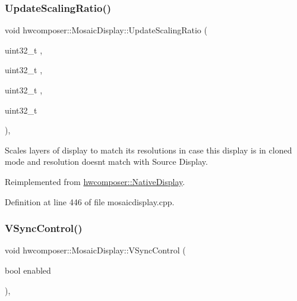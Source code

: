 \subsubsection{\texorpdfstring{Update\+Scaling\+Ratio()}{UpdateScalingRatio()}}
{\footnotesize\ttfamily void hwcomposer\+::\+Mosaic\+Display\+::\+Update\+Scaling\+Ratio (\begin{DoxyParamCaption}\item[{uint32\+\_\+t}]{,  }\item[{uint32\+\_\+t}]{,  }\item[{uint32\+\_\+t}]{,  }\item[{uint32\+\_\+t}]{ }\end{DoxyParamCaption})\hspace{0.3cm}{\ttfamily [override]}, {\ttfamily [virtual]}}

Scales layers of display to match it\textquotesingle{}s resolutions in case this display is in cloned mode and resolution doesn\textquotesingle{}t match with Source Display. 

Reimplemented from \mbox{\hyperlink{classhwcomposer_1_1NativeDisplay_abfad592c2a5e956760c194fa7831171c}{hwcomposer\+::\+Native\+Display}}.



Definition at line 446 of file mosaicdisplay.\+cpp.


\begin{DoxyCode}{0}
\end{DoxyCode}
\mbox{\label{classhwcomposer_1_1MosaicDisplay_a3843cd0fcbd50cfed44d7a0ebdf5539b}} 
\subsubsection{\texorpdfstring{V\+Sync\+Control()}{VSyncControl()}}
{\footnotesize\ttfamily void hwcomposer\+::\+Mosaic\+Display\+::\+V\+Sync\+Control (\begin{DoxyParamCaption}\item[{bool}]{enabled }\end{DoxyParamCaption})\hspace{0.3cm}{\ttfamily [override]}, {\ttfamily [virtual]}}



